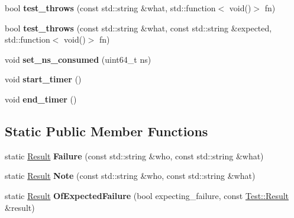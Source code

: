 \begin{DoxyCompactItemize}
\item 
\mbox{\label{class_botan___tests_1_1_test_1_1_result_ae4d9d39359c68414f050fe5a48f82bc2}} 
bool {\bfseries test\+\_\+throws} (const std\+::string \&what, std\+::function$<$ void()$>$ fn)
\item 
\mbox{\label{class_botan___tests_1_1_test_1_1_result_ac9a35497fabff053f01ba46a98168c8a}} 
bool {\bfseries test\+\_\+throws} (const std\+::string \&what, const std\+::string \&expected, std\+::function$<$ void()$>$ fn)
\item 
\mbox{\label{class_botan___tests_1_1_test_1_1_result_ae4c84c0c9b45f10817d8365d4cf2e42c}} 
void {\bfseries set\+\_\+ns\+\_\+consumed} (uint64\+\_\+t ns)
\item 
\mbox{\label{class_botan___tests_1_1_test_1_1_result_a671bb90fbeba39a6e08f2b1571dad024}} 
void {\bfseries start\+\_\+timer} ()
\item 
\mbox{\label{class_botan___tests_1_1_test_1_1_result_a35144943de9f91265503f171ede06ada}} 
void {\bfseries end\+\_\+timer} ()
\end{DoxyCompactItemize}
\subsection*{Static Public Member Functions}
\begin{DoxyCompactItemize}
\item 
\mbox{\label{class_botan___tests_1_1_test_1_1_result_a96b28f8a92d6155825377c468bc0b9e8}} 
static \mbox{\hyperlink{class_botan___tests_1_1_test_1_1_result}{Result}} {\bfseries Failure} (const std\+::string \&who, const std\+::string \&what)
\item 
\mbox{\label{class_botan___tests_1_1_test_1_1_result_a9038413536430febecf799217f5a2abf}} 
static \mbox{\hyperlink{class_botan___tests_1_1_test_1_1_result}{Result}} {\bfseries Note} (const std\+::string \&who, const std\+::string \&what)
\item 
\mbox{\label{class_botan___tests_1_1_test_1_1_result_a0876144f7cf3b0809d5996cb073fc39e}} 
static \mbox{\hyperlink{class_botan___tests_1_1_test_1_1_result}{Result}} {\bfseries Of\+Expected\+Failure} (bool expecting\+\_\+failure, const \mbox{\hyperlink{class_botan___tests_1_1_test_1_1_result}{Test\+::\+Result}} \&result)
\end{DoxyCompactItemize}


